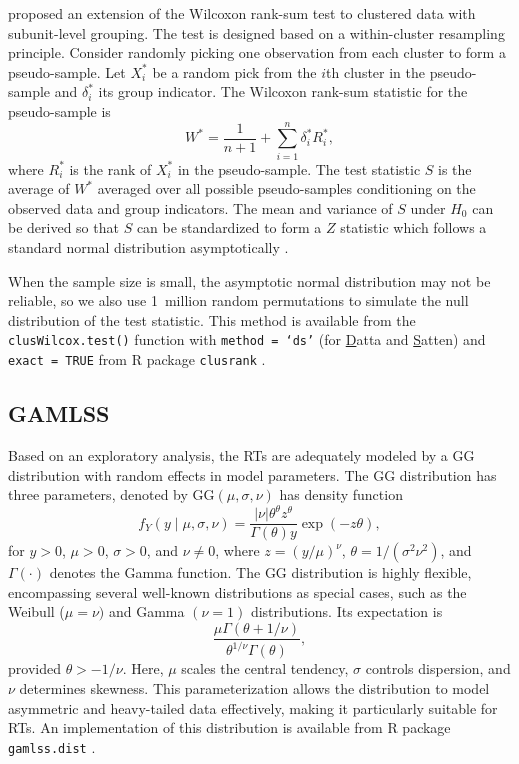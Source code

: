 \documentclass[12pt, letterpaper]{article}
\begin{document}
\citet{datta2005rank} proposed an extension of the Wilcoxon rank-sum test to
clustered data with subunit-level grouping. The test is designed based on a
within-cluster resampling principle. Consider randomly picking one observation
from each cluster to form a pseudo-sample. Let $X_i^*$ be a random pick from the
$i$th cluster in the pseudo-sample and $\delta_i^*$ its group indicator. The
Wilcoxon rank-sum statistic for the pseudo-sample is
\[
W^* = \frac{1}{n + 1} + \sum_{i=1}^{n} \delta_{i}^{*} R_{i}^{*},
\]
where $R_{i}^{*}$ is the rank of $X_{i}^{*}$ in the pseudo-sample.
The test statistic $S$ is the average of $W^*$ averaged over all possible
pseudo-samples conditioning on the observed data and group indicators.
The mean and variance of $S$ under $H_0$ can be derived so that $S$ can be
standardized to form a $Z$ statistic which follows a standard normal distribution
asymptotically \citep[p.910]{datta2005rank}.


When the sample size is small, the asymptotic normal distribution may
not be reliable, so we also use 1~million random permutations to
simulate the null distribution of the test statistic.
This method is available from the \texttt{clusWilcox.test()} function
with \texttt{method = `ds'} (for \underline{D}atta and \underline{S}atten) and
\texttt{exact = TRUE} from R package
\texttt{clusrank} \citep{jiang2020wilcoxon}.


\subsection{GAMLSS}\label{sec:gamlss}

Based on an exploratory analysis, the RTs are adequately
modeled by a GG distribution with random effects in
model parameters. The GG distribution has three parameters, denoted by
$\text{GG}(\mu, \sigma, \nu)$ has density function
\begin{equation}
  \label{eq:gg}
f_Y(y \mid \mu, \sigma, \nu) =
\frac{|\nu| \theta^\theta z^{\theta}}{\Gamma(\theta) y}
\exp\left(-z \theta\right),
\end{equation}
for $y > 0$, $\mu > 0$, $\sigma > 0$, and $\nu \neq 0$,
where $z = (y / \mu)^\nu$,
$\theta = 1 / (\sigma^2 \nu^2)$, and
$\Gamma(\cdot)$ denotes the Gamma function.
The GG distribution is highly flexible, encompassing several
well-known distributions as special cases, such as the
Weibull ($\mu = \nu)$ and  Gamma $(\nu = 1)$ distributions.
Its expectation is
\[
  \frac{\mu \Gamma(\theta + 1 / \nu)}
  {\theta^{1 / \nu} \Gamma(\theta)},
\]
provided $\theta > -1 / \nu$. Here,
$\mu$ scales the central tendency, $\sigma$ controls
dispersion, and $\nu$ determines skewness. This parameterization allows
the distribution to model asymmetric and heavy-tailed data effectively, making
it particularly suitable for RTs.
An implementation of this distribution is available from R package
\texttt{gamlss.dist} \citep{rigby2019distributions}.
\end{document}
